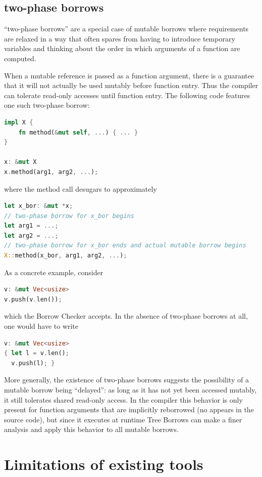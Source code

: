 \documentclass[a4paper,11pt]{article}
\theoremstyle{plain}
\theoremstyle{definition}
\theoremstyle{remark}
\newcommand{\tcode}[1]{\rstinline{#1}}
\begin{document}
\subsection{two-phase borrows}

``two-phase borrows'' are a special case of mutable borrows where requirements
are relaxed in a way that often spares from having to introduce temporary variables
and thinking about the order in which arguments of a function are computed.

When a mutable reference is passed as a function argument, there is a guarantee
that it will not actually be used mutably before function entry. Thus the compiler
can tolerate read-only accesses until function entry.
The following code features one such two-phase borrow:
\begin{lstlisting}[language=rust]
impl X {
    fn method(&mut self, ...) { ... }
}

x: &mut X
x.method(arg1, arg2, ...);
\end{lstlisting}
where the method call desugars to approximately
\begin{lstlisting}[language=rust]
let x_bor: &mut *x;
// two-phase borrow for x_bor begins
let arg1 = ...;
let arg2 = ...;
// two-phase borrow for x_bor ends and actual mutable borrow begins
X::method(x_bor, arg1, arg2, ...);
\end{lstlisting}

As a concrete example, consider
\begin{lstlisting}[language=rust]
v: &mut Vec<usize>
v.push(v.len());
\end{lstlisting}
which the Borrow Checker accepts.
In the absence of two-phase borrows at all, one would have to write
\begin{lstlisting}[language=rust]
v: &mut Vec<usize>
{ let l = v.len();
  v.push(l); }
\end{lstlisting}

More generally, the existence of two-phase borrows suggests the possibility of a mutable
borrow being ``delayed'': as long as it has not yet been accessed mutably, it still
tolerates shared read-only access.
In the compiler this behavior is only present for function arguments that are
implicitly reborrowed (no \tcode{\&mut} appears in the source code), but since it
executes at runtime Tree Borrows can make a finer analysis and apply this behavior
to all mutable borrows.


\section{Limitations of existing tools}
\end{document}
